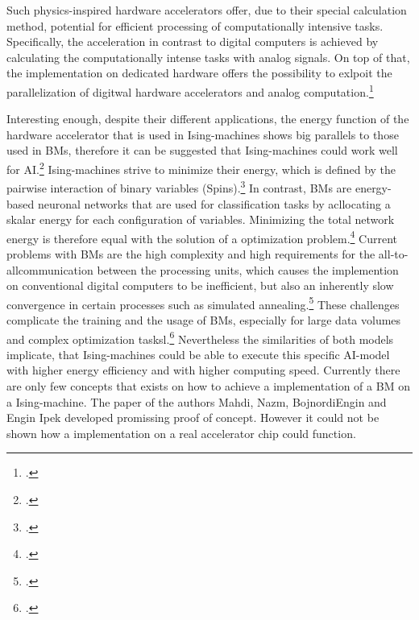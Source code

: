 Such physics-inspired hardware accelerators offer, due to their special calculation method,
potential for efficient processing of computationally intensive tasks. 
Specifically, the acceleration in contrast to digital computers is achieved by calculating
the computationally intense tasks with analog signals.
On top of that, the implementation on dedicated hardware offers the possibility to exlpoit the parallelization
of digitwal hardware accelerators and analog computation.\footcite[cf.][4]{mohseniIsingMachinesHardware2022}

Interesting enough, despite their different applications, the energy function of the hardware accelerator that is used
in Ising-machines shows big parallels to those used in \ac{BM}s, therefore it can be suggested that Ising-machines could work well for AI.\footcite[cf.][10]{caiHarnessingIntrinsicNoise2019}
Ising-machines strive to minimize their energy, which is defined by the pairwise 
interaction of binary variables (Spins).\footcite[cf.][1]{wangOscillatorbasedIsingMachine2017} 
In contrast, \ac{BM}s are energy-based neuronal networks that are used for classification tasks by 
acllocating a skalar energy for each configuration of variables.
Minimizing the total network energy is therefore equal with the solution of a optimization problem.\footcite[cf.][2]{nazmbojnordiMemristiveBoltzmannMachine2016} 
Current problems with \ac{BM}s are the high complexity and high requirements for the all-to-allcommunication between the processing units,
which causes the implemention on conventional digital computers to be inefficient, but also 
an inherently slow convergence in certain processes such as simulated annealing.\footcite[cf.][1]{nazmbojnordiMemristiveBoltzmannMachine2016} 
These challenges complicate the training and the usage of \ac{BM}s, especially for large data volumes and complex optimization tasksl.\footcite[cf.][2]{nazmbojnordiMemristiveBoltzmannMachine2016} 
Nevertheless the similarities of both models implicate, that Ising-machines could be able to execute this 
specific AI-model with higher energy efficiency and with higher computing speed.
Currently there are only few concepts that exists on how to achieve a implementation of a \ac{BM} on a Ising-machine.
The paper of the authors Mahdi, Nazm, BojnordiEngin and Engin Ipek developed promissing proof of concept.
However it could not be shown how a implementation on a real accelerator chip could function.

